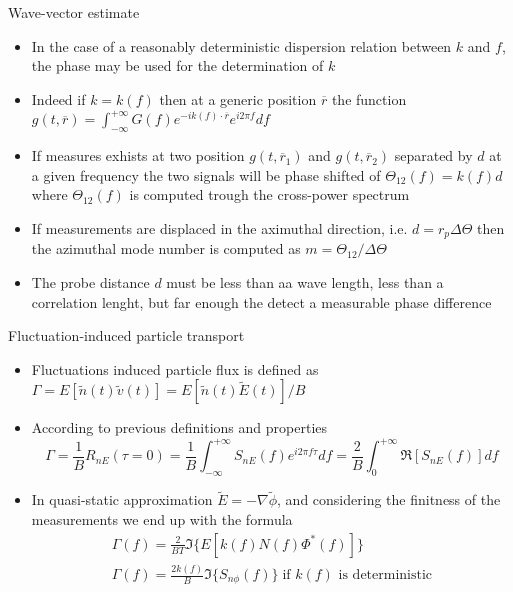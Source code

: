 \documentclass[t,10pt]{beamer}
\begin{document}
\begin{frame}{Wave-vector estimate}
\begin{itemize}[<+-|alert@+>]
\item In the case of a reasonably deterministic dispersion relation between $k$ and $f$, the phase may be
  used for the determination of $k$
\item Indeed if $k = k(f)$ then at a generic position $\overline{r}$
  the function $g(t,\overline{r}) =
  \int_{-\infty}^{+\infty}G(f)e^{-ik(f)\cdot \overline{r}}e^{i2\pi f}df$
\item If measures exhists at two position $g(t,\overline{r}_1)$ and
  $g(t,\overline{r}_2)$ separated by $d$ at a given frequency the two signals will be
  phase shifted of $\Theta_{12}(f)=k(f)d$ where $\Theta_{12}(f)$ is
  computed trough the cross-power spectrum
\item If measurements are displaced in the aximuthal direction,
  i.e. $d=r_p\Delta\Theta$ then the azimuthal mode number is computed
  as $m=\Theta_{12}/\Delta\Theta$
\item \textcolor{tachameleon}{The probe distance $d$ must be less than
  aa wave length, less than a correlation lenght, but far enough the
  detect a measurable phase difference}
\end{itemize}
\end{frame}

\begin{frame}{Fluctuation-induced particle transport}
\begin{itemize}
\item Fluctuations induced particle flux is defined as $\Gamma = E[\tilde{n}(t)\tilde{v}(t)]=E[\tilde{n}(t)\tilde{E}(t)]/B$
\item According to previous definitions and properties 
\begin{equation*}
\Gamma
=\frac{1}{B}R_{nE}(\tau=0)=\frac{1}{B}\int_{-\infty}^{+\infty}S_{nE}(f)e^{i2\pi
f\tau}df = \frac{2}{B}\int_0^{+\infty}\Re[S_{nE}(f)]df
\end{equation*}
\item In quasi-static approximation $\tilde{E}=-\nabla\tilde{\phi}$,
  and considering the finitness of the measurements we
  end up with the formula
\begin{eqnarray*}
\Gamma(f) = \frac{2}{BT}\Im\{ E[k(f)N(f)\Phi^{*}(f)]\} \\
\Gamma(f)=\frac{2k(f)}{B}\Im\{S_{n\phi}(f)\} \; \text{if $k(f)$ is deterministic}
\end{eqnarray*}
\end{itemize}
\end{frame}
\end{document}
